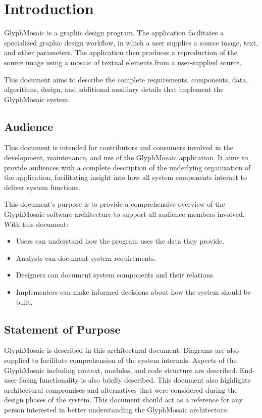 \section{Introduction}
GlyphMosaic is a graphic design program.
The application facilitates a specialized graphic design workflow, in which a user supplies a source image, text, and other parameters.
The application then produces a reproduction of the source image using a mosaic of textual elements from a user-supplied source.

This document aims to describe the complete requirements, components, data, algorithms, design, and additional auxiliary details that implement the GlyphMosaic system.


\subsection{Audience}
This document is intended for contributors and consumers involved in the development, maintenance, and use of the GlyphMosaic application.
It aims to provide audiences with a complete description of the underlying organization of the application, facilitating insight into how all system components interact to deliver system functions.

This document's purpose is to provide a comprehensive overview of the GlyphMosaic software architecture to support all audience members involved.
With this document:
\begin{itemize}
    \item Users can understand how the program uses the data they provide.
    \item Analysts can document system requirements.
    \item Designers can document system components and their relations.
    \item Implementers can make informed decisions about how the system should be built.
\end{itemize}


\subsection{Statement of Purpose}
GlyphMosaic is described in this architectural document.
Diagrams are also supplied to facilitate comprehension of the system internals.
Aspects of the GlyphMosaic including context, modules, and code structure are described.
End-user-facing functionality is also briefly described.
This document also highlights architectural compromises and alternatives that were considered during the design phases of the system.
This document should act as a reference for any person interested in better understanding the GlyphMosaic architecture.


